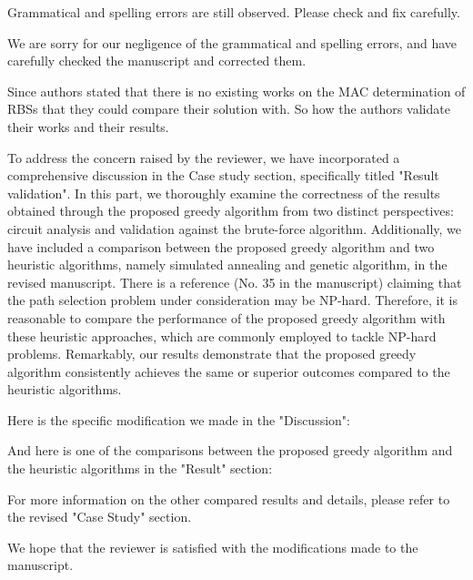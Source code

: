 \reviewer
\begin{revcomment}
  Grammatical and spelling errors are still observed. Please check and fix carefully.
\end{revcomment}
\begin{revresponse}

We are sorry for our negligence of the grammatical and spelling errors, and have carefully checked the manuscript and corrected them. 

\end{revresponse}

\begin{revcomment}
  Since authors stated that there is no existing works on the MAC determination of RBSs that they could compare their solution with. So how the authors validate their works and their results.
\end{revcomment}
\begin{revresponse}



To address the concern raised by the reviewer, we have incorporated a comprehensive discussion in the Case study section, specifically titled "Result validation". 
In this part, we thoroughly examine the correctness of the results obtained through the proposed greedy algorithm from two distinct perspectives: circuit analysis and validation against the brute-force algorithm. 
Additionally, we have included a comparison between the proposed greedy algorithm and two heuristic algorithms, namely simulated annealing and genetic algorithm, in the revised manuscript. 
There is a reference (No. 35 in the manuscript) claiming that the path selection problem under consideration may be NP-hard.
Therefore, it is reasonable to compare the performance of the proposed greedy algorithm with these heuristic approaches, which are commonly employed to tackle NP-hard problems.
Remarkably, our results demonstrate that the proposed greedy algorithm consistently achieves the same or superior outcomes compared to the heuristic algorithms.


Here is the specific modification we made in the "Discussion":
\begin{changes}
\end{changes}
And here is one of the comparisons between the proposed greedy algorithm and the heuristic algorithms in the "Result" section:
\begin{changes}
\end{changes}
For more information on the other compared results and details, please refer to the revised "Case Study" section.


We hope that the reviewer is satisfied with the modifications made to the manuscript.
\end{revresponse}

